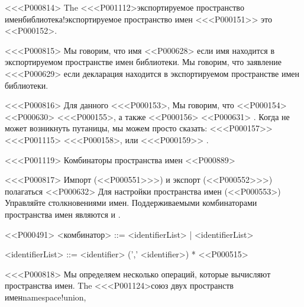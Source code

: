 {{{{{{{{{{{{{{<<<P000814>%
The
<<<P001112>{экспортируемое пространство имен}{библиотека!экспортируемое пространство имен}
<<<P000151>> это
<<P000152>.

<<<P000815>%
Мы говорим, что имя <<P000628>
если имя находится в экспортируемом пространстве имен библиотеки.
Мы говорим, что заявление <<<P000629>
если декларация находится в экспортируемом пространстве имен библиотеки.

<<<P000816>%
Для данного <<<P000153>,
Мы говорим, что <<P000154>
<<P000630>
<<<P000155>, а также <<P000156>
<<P000631>
.
Когда не может возникнуть путаницы, мы можем просто сказать:
<<<P000157>> <<<P001115> <<<P000158>, или
<<<P000159>>  .


<<<P001119> Комбинаторы пространства имен
<<P000889>

<<<P000817>%
Импорт (<<P000551>>>) и экспорт (<<P000552>>>) полагаться
<<P000632>
Для настройки пространства имен
(<<P000553>)
Управляйте столкновениями имен.
Поддерживаемыми комбинаторами пространства имен являются \SHOW{} и \HIDE.

<<P000491>
<комбинатор> ::= \SHOW{} <identifierList> | \HIDE{} <identifierList>

<identifierList> ::= <identifier> (',' <identifier>) *
<<P000515>

<<<P000818>%
Мы определяем несколько операций, которые вычисляют пространства имен.
The
<<<P001124>{союз двух пространств имен}{namespace!union},
}}}}}}}}}}}}}}
